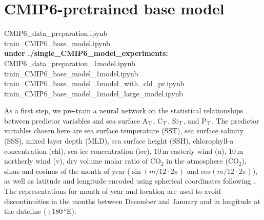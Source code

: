\documentclass{article}
\begin{document}
	\section{CMIP6-pretrained base model} \label{sect:cmip6-pretraining}
	\begin{tcolorbox}[colback=gray!5!white, colframe=black!75!white, 
		fonttitle=\bfseries, title=Jupyter Notebooks, 
		rounded corners, width=\textwidth]
		CMIP6\_data\_preparation.ipynb \\
		train\_CMIP6\_base\_model.ipynb \\
		\textbf{under ./single\_CMIP6\_model\_experiments:} \\
		CMIP6\_data\_preparation\_1model.ipynb \\
		train\_CMIP6\_base\_model\_1model.ipynb \\
		train\_CMIP6\_base\_model\_1model\_with\_cld\_pr.ipynb \\
		train\_CMIP6\_base\_model\_1model\_large\_model.ipynb
	\end{tcolorbox}

	As a first step, we pre-train a neural network on the statistical relationships between predictor variables and sea surface A$_\textup{T}$, C$_\textup{T}$, Si$_\textup{T}$, and P$_\textup{T}$. The predictor variables chosen here are sea surface temperature (SST), sea surface salinity (SSS), mixed layer depth (MLD), sea surface height (SSH), chlorophyll-a concentration (chl), sea ice concentration (ice), 10\,m easterly wind (u), 10\,m northerly wind (v),
	dry volume molar ratio of CO$_2$ in the atmosphere (CO$_2$), sinus and cosinus of the month of year ($\sin(m / 12 \cdot 2\pi)$ and $cos(m / 12 \cdot 2\pi)$), as well as latitude and longitude encoded using spherical coordinates following \cite{gade2010}. The representations for month of year and location are used to avoid discontinuities in the months between December and January and in longitude at the dateline ($\pm180$\,°E).
	
\end{document}
